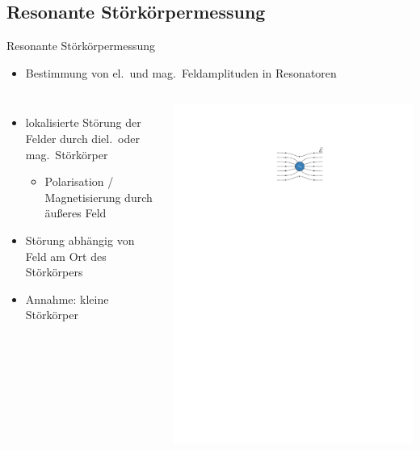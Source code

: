\documentclass[12pt,xcolor=dvipsnames,professionalfonts]{beamer}
\begin{document}
\subsection{Resonante Störkörpermessung}

\begin{frame}{Resonante Störkörpermessung}
	\begin{itemize}
		\item Bestimmung von el.\ und mag.\ Feldamplituden in Resonatoren
	\end{itemize}
	\vspace*{0.12cm}
	\begin{columns}[c,onlytextwidth]
		\begin{itemize}
			\setlength\itemsep{1.25em}
			\item lokalisierte Störung der Felder durch diel.\ oder mag.\ Störkörper
			\begin{itemize}
				\item Polarisation / Magnetisierung durch äußeres Feld
			\end{itemize}

			\item Störung abhängig von Feld am Ort des Störkörpers
			
			\item Annahme: kleine Störkörper
		
	\end{itemize}
		\centering
		\includegraphics[scale=1.0]{./figures/stoerung.pdf}
		

\end{columns}
\end{frame}
\end{document}
